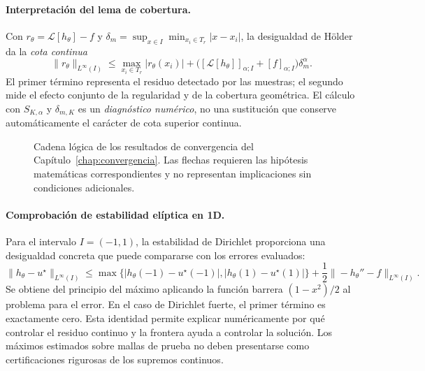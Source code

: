 \paragraph{Interpretación del lema de cobertura.}
Con $r_\theta=\mathcal L[h_\theta]-f$ y $\delta_m=\sup_{x\in I}\min_{x_i\in T_r}|x-x_i|$, la desigualdad de H\"older da la \emph{cota continua}
\[
\|r_\theta\|_{L^\infty(I)}
\leq \max_{x_i\in T_r}|r_\theta(x_i)|
+\bigl([\mathcal L[h_\theta]]_{\alpha;I}+[f]_{\alpha;I}\bigr)\delta_m^\alpha.
\]
El primer término representa el residuo detectado por las muestras; el segundo mide el efecto conjunto de la regularidad y de la cobertura geométrica. El cálculo con $S_{K,\alpha}$ y $\delta_{m,K}$ es un \emph{diagnóstico numérico}, no una sustitución que conserve automáticamente el carácter de cota superior continua.

\begin{figure}[h!]
\centering
{}
\caption{Cadena lógica de los resultados de convergencia del Capítulo~\ref{chap:convergencia}. Las flechas requieren las hipótesis matemáticas correspondientes y no representan implicaciones sin condiciones adicionales.}
\label{fig:cadena_convergencia_comp}
\end{figure}

\paragraph{Comprobación de estabilidad elíptica en 1D.}
Para el intervalo $I=(-1,1)$, la estabilidad de Dirichlet proporciona una desigualdad concreta que puede compararse con los errores evaluados:
\[
\|h_\theta-u^\star\|_{L^\infty(I)}
\leq \max\bigl\{|h_\theta(-1)-u^\star(-1)|,|h_\theta(1)-u^\star(1)|\bigr\}
+\frac12\|-h_\theta''-f\|_{L^\infty(I)}.
\]
Se obtiene del principio del máximo aplicando la función barrera $(1-x^2)/2$ al problema para el error. En el caso de Dirichlet fuerte, el primer término es exactamente cero. Esta identidad permite explicar numéricamente por qué controlar el residuo continuo y la frontera ayuda a controlar la solución. Los máximos estimados sobre mallas de prueba no deben presentarse como certificaciones rigurosas de los supremos continuos.

